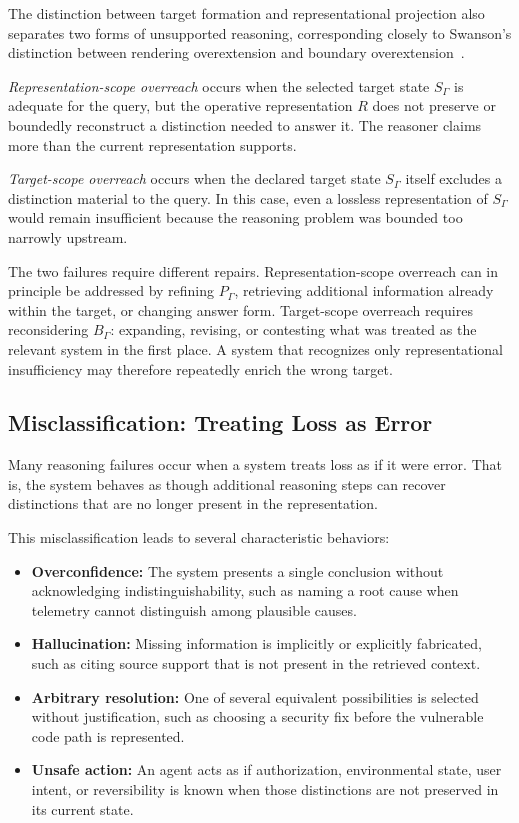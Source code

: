 \documentclass[11pt]{article}
\theoremstyle{definition}
\theoremstyle{remark}
\begin{document}
The distinction between target formation and representational projection also separates two forms of unsupported reasoning, corresponding closely to Swanson's distinction between rendering overextension and boundary overextension~\cite{Swanson2026Monist}.

\emph{Representation-scope overreach} occurs when the selected target state \(S_{\Gamma}\) is adequate for the query, but the operative representation \(R\) does not preserve or boundedly reconstruct a distinction needed to answer it. The reasoner claims more than the current representation supports.

\emph{Target-scope overreach} occurs when the declared target state \(S_{\Gamma}\) itself excludes a distinction material to the query. In this case, even a lossless representation of \(S_{\Gamma}\) would remain insufficient because the reasoning problem was bounded too narrowly upstream.

The two failures require different repairs. Representation-scope overreach can in principle be addressed by refining \(P_{\Gamma}\), retrieving additional information already within the target, or changing answer form. Target-scope overreach requires reconsidering \(B_{\Gamma}\): expanding, revising, or contesting what was treated as the relevant system in the first place. A system that recognizes only representational insufficiency may therefore repeatedly enrich the wrong target.

\subsection{Misclassification: Treating Loss as Error}

Many reasoning failures occur when a system treats loss as if it were error. That is, the system behaves as though additional reasoning steps can recover distinctions that are no longer present in the representation.

This misclassification leads to several characteristic behaviors:
\begin{itemize}[leftmargin=1.5em]
    \item \textbf{Overconfidence:} The system presents a single conclusion without acknowledging indistinguishability, such as naming a root cause when telemetry cannot distinguish among plausible causes.
    \item \textbf{Hallucination:} Missing information is implicitly or explicitly fabricated, such as citing source support that is not present in the retrieved context.
    \item \textbf{Arbitrary resolution:} One of several equivalent possibilities is selected without justification, such as choosing a security fix before the vulnerable code path is represented.
    \item \textbf{Unsafe action:} An agent acts as if authorization, environmental state, user intent, or reversibility is known when those distinctions are not preserved in its current state.
\end{itemize}
\end{document}
